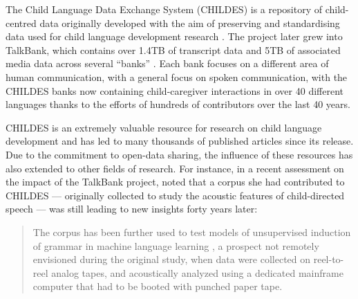 
The Child Language Data Exchange System (CHILDES) is a repository of child-centred data originally developed with the aim of preserving and standardising data used for child language development research \citep{macwhinney1985child}. The project later grew into TalkBank, which contains over 1.4TB of transcript data and 5TB of associated media data across several ``banks'' \citep{macwhinney_understanding_2019}. Each bank focuses on a different area of human communication, with a general focus on spoken communication, with the CHILDES banks now containing child-caregiver interactions in over 40 different languages thanks to the efforts of hundreds of contributors over the last 40 years. 

CHILDES is an extremely valuable resource for research on child language development and has led to many thousands of published articles since its release. Due to the commitment to open-data sharing, the influence of these resources has also extended to other fields of research. For instance, in a recent assessment on the impact of the TalkBank project, \citet{bernstein_ratner_augmenting_2024} noted that a corpus she had contributed to CHILDES --- originally collected to study the acoustic features of child-directed speech \citep{Ratner_1984} --- was still leading to new insights forty years later:
\begin{quote}
The corpus has been further used to test models of unsupervised induction of grammar in machine language learning \citep{glushchenko_programmatic_2019}, a prospect not remotely envisioned during the original study, when data were collected on reel-to-reel analog tapes, and acoustically analyzed using a dedicated mainframe computer that had to be booted with punched paper tape.
\end{quote}

